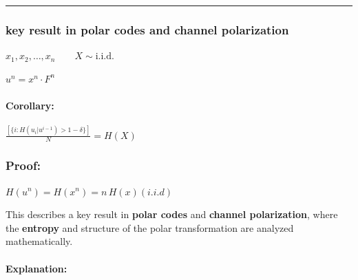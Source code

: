 \documentclass[11pt]{article}
\begin{document}
\begin{center}\rule{0.5\linewidth}{0.5pt}\end{center}

    \subsubsection{\texorpdfstring{key result in \textbf{polar codes} and
\textbf{channel
polarization}}{key result in polar codes and channel polarization}}\label{key-result-in-polar-codes-and-channel-polarization}

\(x_1, x_2, \dots, x_n \qquad X \sim  \text{i.i.d.}\)

\(u^n = x^n \cdot F^n\)

\paragraph{Corollary:}\label{corollary}

\(\frac{\left[ \{ i : H(u_i | u^{i-1}) > 1 - \delta \} \right]}{N} = H(X)\)

\subsubsection{Proof:}\label{proof}

\(H(u^n) = H(x^n) = n \, H(x) (i.i.d)\)

This describes a key result in \textbf{polar codes} and \textbf{channel
polarization}, where the \textbf{entropy} and structure of the polar
transformation are analyzed mathematically.

\paragraph{Explanation:}\label{explanation}
\end{document}
